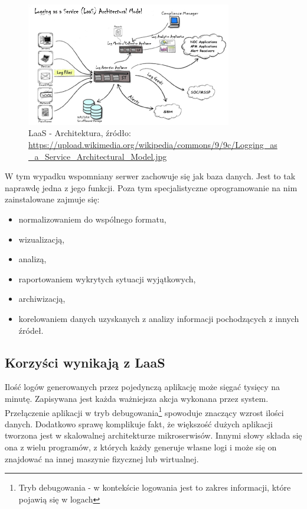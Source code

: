     \begin{figure}[H]
        \centering
        \includegraphics[width=0.80\textwidth]{images/Logging_as_a_Service_Architectural_Model}
        \caption[LaaS - Architektura]{
            LaaS - Architektura, źródło: \url{https://upload.wikimedia.org/wikipedia/commons/9/9c/Logging_as_a_Service_Architectural_Model.jpg}
        }
        \label{chapter:monitoring_architecture:laas:architecture_image}
    \end{figure}
    
    W tym wypadku wspomniany serwer zachowuje się
    jak baza danych. Jest to tak naprawdę jedna z jego funkcji. Poza tym specjalistyczne oprogramowanie na nim zainstalowane zajmuje się:
    \begin{itemize}
        \item normalizowaniem do wspólnego formatu,
        \item wizualizacją,
        \item analizą,
        \item raportowaniem wykrytych sytuacji wyjątkowych,
        \item archiwizacją,
        \item korelowaniem danych uzyskanych z analizy informacji pochodzących z innych źródeł.
    \end{itemize} \cite{laas_wikipedia}
    
    \subsection{Korzyści wynikają z LaaS}
    Ilość logów generowanych przez pojedynczą aplikację może sięgać tysięcy na minutę.
    Zapisywana jest każda ważniejsza akcja wykonana przez system. Przełączenie aplikacji
    w tryb debugowania\footnote{Tryb debugowania - w kontekście logowania jest to zakres informacji,
        które pojawią się w logach} spowoduje znaczący wzrost ilości danych.
    Dodatkowo sprawę komplikuje fakt, że większość dużych aplikacji tworzona jest w skalowalnej architekturze
    mikroserwisów. Innymi słowy składa się ona z wielu programów, z których każdy generuje własne logi i
    może się on znajdować na innej maszynie fizycznej lub wirtualnej.
    
